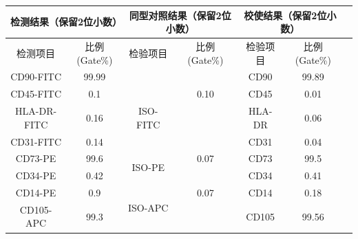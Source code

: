 \documentclass[UTF8,10pt,a4paper,fontset=fandol]{ctexart}
\newcommand{\fieldvalue}[1]{#1}
\newcommand{\handwritten}[1]{#1}
\begin{document}
\small
\begin{tabularx}{\textwidth}{|c|c|c|c|c|c|c|}
\hline
\multicolumn{2}{|c|}{检测结果（保留2位小数）} &
\multicolumn{2}{c|}{同型对照结果（保留2位小数）} &
\multicolumn{2}{c|}{校使结果（保留2位小数）} \\
\hline
检测项目 & 比例(Gate\%) & 检验项目 & 比例(Gate\%) & 检验项目 & 比例(Gate\%) \\
\hline
CD90-FITC &
\fieldvalue{\handwritten{99.99}} &
\multicolumn{1}{c|}{} & & CD90 &
\fieldvalue{\handwritten{99.89}} \\
\hline
CD45-FITC &
\fieldvalue{\handwritten{0.1}} &
\multirow{3}{*}{ISO-FITC} &
\fieldvalue{\handwritten{0.10}} &
CD45 &
\fieldvalue{\handwritten{0.01}} \\
\hline
HLA-DR-FITC &
\fieldvalue{\handwritten{0.16}} & & & HLA-DR &
\fieldvalue{\handwritten{0.06}} \\
\hline
CD31-FITC & 
\fieldvalue{\handwritten{0.14}} & & & CD31 &
\fieldvalue{\handwritten{0.04}} \\
\hline
CD73-PE &
\fieldvalue{\handwritten{99.6}} &
\multirow{2}{*}{ISO-PE} &
\fieldvalue{\handwritten{0.07}} &
CD73 &
\fieldvalue{\handwritten{99.5}} \\
\hline
CD34-PE &
\fieldvalue{\handwritten{0.42}} & & & CD34 &
\fieldvalue{\handwritten{0.41}} \\
\hline
CD14-PE &
\fieldvalue{\handwritten{0.9}} &
\multirow{2}{*}{ISO-APC} &
\fieldvalue{\handwritten{0.07}} &
CD14 &
\fieldvalue{\handwritten{0.18}} \\
\hline
CD105-APC &
\fieldvalue{\handwritten{99.3}} & & & CD105 &
\fieldvalue{\handwritten{99.56}} \\
\hline
\end{tabularx}
\end{document}
